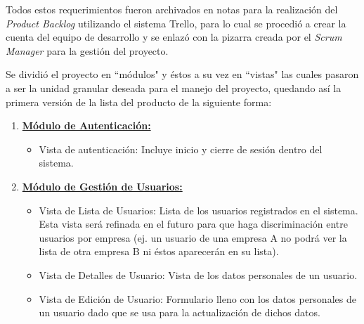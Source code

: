     Todos estos requerimientos fueron archivados en notas para la realización del \textit{Product Backlog} utilizando el sistema Trello, para lo cual se procedió a crear la cuenta del equipo de desarrollo y se enlazó con la pizarra creada por el \textit{Scrum Manager} para la gestión del proyecto.
    
    Se dividió el proyecto en ``módulos" y éstos a su vez en ``vistas" las cuales pasaron a ser la unidad granular deseada para el manejo del proyecto, quedando así la primera versión de la lista del producto de la siguiente forma:
    
    \begin{enumerate}
        \item \textbf{\underline{Módulo de Autenticación:}}
        
        \begin{itemize}
            \item Vista de autenticación: Incluye inicio y cierre de sesión dentro del sistema.
        \end{itemize}
        
        \item \textbf{\underline{Módulo de Gestión de Usuarios:}}
        
        \begin{itemize}
            \item Vista de Lista de Usuarios: Lista de los usuarios registrados en el sistema. Esta vista será refinada en el futuro para que haga discriminación entre usuarios por empresa (ej. un usuario de una empresa A no podrá ver la lista de otra empresa B ni éstos aparecerán en su lista).
            \item Vista de Detalles de Usuario: Vista de los datos personales de un usuario.
            \item Vista de Edición de Usuario: Formulario lleno con los datos personales de un usuario dado que se usa para la actualización de dichos datos.
        \end{itemize}
        
        

\end{enumerate}
